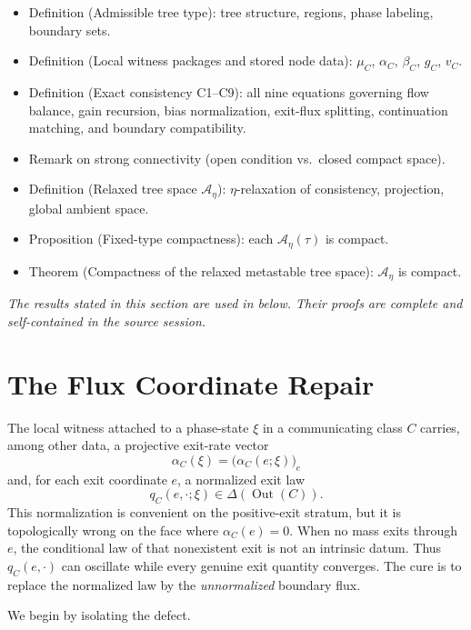 \documentclass[12pt,a4paper]{article}
\theoremstyle{definition}
\DeclareMathOperator{\Out}{Out}
\begin{document}
\begin{itemize}
\item Definition (Admissible tree type): tree structure, regions, phase labeling, boundary sets.
\item Definition (Local witness packages and stored node data): $\mu_C$, $\alpha_C$, $\beta_C$, $g_C$, $v_C$.
\item Definition (Exact consistency C1--C9): all nine equations governing flow balance, gain recursion, bias normalization, exit-flux splitting, continuation matching, and boundary compatibility.
\item Remark on strong connectivity (open condition vs.\ closed compact space).
\item Definition (Relaxed tree space $\mathcal{A}_\eta$): $\eta$-relaxation of consistency, projection, global ambient space.
\item Proposition (Fixed-type compactness): each $\mathcal{A}_\eta(\tau)$ is compact.
\item Theorem (Compactness of the relaxed metastable tree space): $\mathcal{A}_\eta$ is compact.
\end{itemize}

\noindent\textit{The results stated in this section are used in  below.  Their proofs are complete and self-contained in the source session.}

\section{The Flux Coordinate Repair}
\label{sec:flux}

The local witness attached to a phase-state $\xi$ in a communicating class $C$ carries, among other data, a projective exit-rate vector
\[
\alpha_C(\xi)=\big(\alpha_C(e;\xi)\big)_e
\]
and, for each exit coordinate $e$, a normalized exit law
\[
q_C(e,\cdot;\xi)\in \Delta(\Out(C)).
\]
This normalization is convenient on the positive-exit stratum, but it is topologically wrong on the face where $\alpha_C(e)=0$. When no mass exits through $e$, the conditional law of that nonexistent exit is not an intrinsic datum. Thus $q_C(e,\cdot)$ can oscillate while every genuine exit quantity converges. The cure is to replace the normalized law by the \emph{unnormalized} boundary flux.

We begin by isolating the defect.
\end{document}
